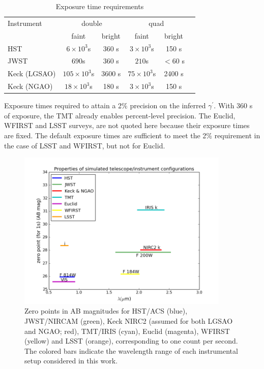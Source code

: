 \documentclass[a4paper,11pt]{article}
\begin{document}
\begin{table}\footnotesize
\begin{center}
\caption{Exposure time requirements}
\begin{tabular}{lccccc|}
\hline \hline
Instrument & \multicolumn{2}{c}{double} & \multicolumn{2}{c}{quad} \\
  & faint  & bright &  faint  &  bright \\
\hline
  HST   & $6\times10^3$s & 360 s  & $3\times10^3$s & 150 s \\
  JWST   & $690$s & 360 s  & $210$s & $<$60 s \\
  Keck (LGSAO)   & $105\times10^3$s & 3600 s  & $75\times10^3$s & 2400 s \\
  Keck (NGAO)   & $18\times10^3$s & 180 s  & $3\times10^3$s & 150 s \\
\hline
\hline
\end{tabular}
\begin{tablenotes}
\item 
Exposure times required to attain a 2\% precision on the inferred $\gamma^\prime.$
 With 360 s of exposure, the TMT already enables percent-level precision.
 The Euclid, WFIRST and LSST surveys, are not quoted here because their exposure times are fixed. The default exposure times are sufficient to meet the 2\% requirement in the case of LSST and WFIRST, but not for Euclid.\\
\end{tablenotes}
\label{tab:exptimes}
\end{center}
\end{table}

\begin{figure}
\begin{center}
\includegraphics[width=0.9\textwidth]{figures/wavelength_zp.png}
\end{center}
\caption{Zero points in AB magnitudes for HST/ACS (blue), JWST/NIRCAM (green), Keck NIRC2  (assumed for both LGSAO and NGAO; red), TMT/IRIS (cyan), Euclid (magenta), WFIRST (yellow) and LSST (orange), corresponding to one count per second. The colored bars indicate the wavelength range of each instrumental setup considered in this work.}
\label{fig:zp_wavelength}
\end{figure}
\end{document}
